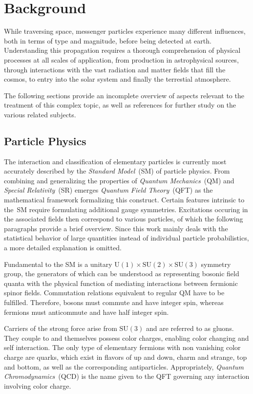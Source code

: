 \chapter{Background}
\label{ch:background}

While traversing space, messenger particles experience many different influences, both in terms of type and magnitude, before being
detected at earth. Understanding this propagation requires a thorough comprehension of physical processes at all scales of application,
from production in astrophysical sources, through interactions with the vast radiation and matter fields that fill the cosmos, to entry
into the solar system and finally the terrestial atmosphere.

The following sections provide an incomplete overview of aspects relevant to the treatment of this complex topic, as well as references
for further study on the various related subjects.

\section{Particle Physics}
\label{sec:particle}

The interaction and classification of elementary particles is currently most accurately described by the \emph{Standard Model}~(SM)
of particle physics. From combining and generalizing the properties of \emph{Quantum Mechanics}~(QM) and \emph{Special Relativity}~(SR)
emerges \emph{Quantum Field Theory}~(QFT) as the mathematical framework formalizing this construct. Certain features intrinsic to the~SM
require formulating additional gauge symmetries. Excitations occuring in the associated fields then correspond to
various particles, of which the following paragraphs provide a brief overview. Since this work mainly deals with the statistical behavior
of large quantities instead of individual particle probabilistics, a more detailed explanation is omitted.

Fundamental to the SM is a unitary $\text{U}(1) \times \text{SU}(2) \times \text{SU}(3)$ symmetry group, the generators of which can be
understood as representing bosonic field quanta with the physical function of mediating interactions between fermionic spinor fields.
Commutation relations equivalent to regular QM have to be fulfilled. Therefore, bosons must commute and have integer spin, whereas
fermions must anticommute and have half integer spin.

Carriers of the strong force arise from $\text{SU}(3)$ and are referred to as gluons. They couple to and themselves possess color
charges, enabling color changing and self interaction. The only type of elementary fermions with non vanishing color charge are quarks,
which exist in flavors of up and down, charm and strange, top and bottom, as well as the corresponding antiparticles. Appropriately,
\emph{Quantum Chromodynamics}~(QCD) is the name given to the QFT governing any interaction involving color charge.


